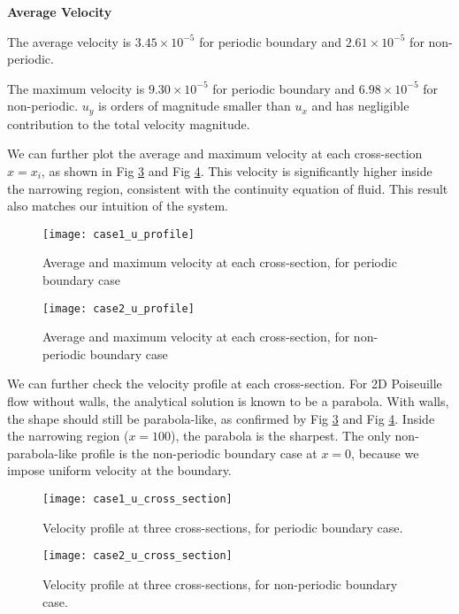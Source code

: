\begin{solution} 
\textbf{Average Velocity}

The average velocity is $3.45 \times 10^{-5}$ for periodic boundary and $2.61 \times 10^{-5}$ for non-periodic. 

The maximum velocity is $9.30 \times 10^{-5}$ for periodic boundary and $6.98 \times 10^{-5}$ for non-periodic. $u_y$ is orders of magnitude smaller than $u_x$ and has negligible contribution to the total velocity magnitude.

We can further plot the average and maximum velocity at each cross-section $x=x_i$, as shown in Fig \ref{fig:profile_case1} and Fig \ref{fig:profile_case2}. This velocity is significantly higher inside the narrowing region, consistent with the continuity equation of fluid. This result also matches our intuition of the system.

\begin{figure}[H]
\texttt{[image: case1\_u\_profile]}
\centering
\caption{Average and maximum velocity at each cross-section, for periodic boundary case}
\label{fig:profile_case1}
\end{figure}

\begin{figure}[H]
\texttt{[image: case2\_u\_profile]}
\centering
\caption{Average and maximum velocity at each cross-section, for non-periodic boundary case}
\label{fig:profile_case2}
\end{figure}

\end{solution}

\begin{solution} 

We can further check the velocity profile at each cross-section. For 2D Poiseuille flow without walls, the analytical solution is known to be a parabola. With walls, the shape should still be parabola-like, as confirmed by Fig \ref{fig:profile_case1} and Fig \ref{fig:profile_case2}. Inside the narrowing region ($x=100$), the parabola is the sharpest. The only non-parabola-like profile is the non-periodic boundary case at $x=0$, because we impose uniform velocity at the boundary.

\begin{figure}[H]
\texttt{[image: case1\_u\_cross\_section]}
\centering
\caption{Velocity profile at three cross-sections, for periodic boundary case.}
\label{fig:profile_case1}
\end{figure}

\begin{figure}[H]
\texttt{[image: case2\_u\_cross\_section]}
\centering
\caption{Velocity profile at three cross-sections, for non-periodic boundary case.}
\label{fig:profile_case2}
\end{figure}

\end{solution}

